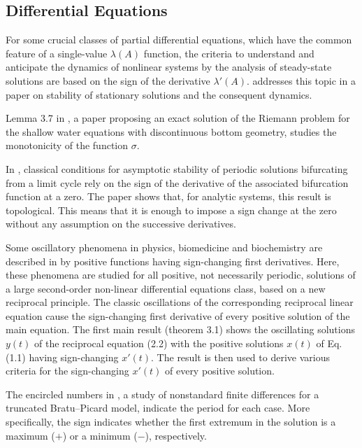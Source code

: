 \documentclass[11pt]{book}
\begin{document}

\subsection{Differential Equations}

For some crucial classes of partial differential equations, which have the common feature of
a single-value $\lambda\left(A\right)$ function, the criteria to
understand and anticipate the dynamics of nonlinear systems by the
analysis of steady-state solutions are based on the sign of the derivative
$\lambda'\left(A\right)$. \cite{politi2007modified} addresses this topic in a paper on stability of
stationary solutions and the consequent dynamics.

Lemma 3.7 in \cite{bernetti2008exact}, a paper proposing an exact solution of the Riemann
problem for the shallow water equations with discontinuous bottom geometry, studies the monotonicity of
the function $\sigma$.

In \cite{makarenkov2011asymptotic}, classical conditions for asymptotic
stability of periodic solutions bifurcating from a limit cycle rely
on the sign of the derivative of the associated bifurcation function
at a zero. The paper shows that, for analytic systems, this result
is topological. This means that it is enough to impose a sign change
at the zero without any assumption on the successive derivatives.

Some oscillatory phenomena in physics, biomedicine and
biochemistry are described in \cite{pavsic2015sign} by positive functions
having sign-changing first derivatives. Here, these phenomena are studied for all
positive, not necessarily periodic, solutions of a large second-order
non-linear differential equations class, based on a new reciprocal
principle. The classic oscillations of the corresponding reciprocal
linear equation cause the sign-changing first derivative of every
positive solution of the main equation. The first main result (theorem
3.1) shows the oscillating solutions $y\left(t\right)$ of
the reciprocal equation (2.2) with the positive solutions $x\left(t\right)$
of Eq. (1.1) having sign-changing $x'\left(t\right)$. The result is then
used to derive various criteria for the sign-changing $x'\left(t\right)$
of every positive solution.

The encircled numbers in \cite{zegeling2018nonstandard}, a study of nonstandard finite differences for a truncated
Bratu–Picard model, indicate
the period for each case. More specifically, the sign indicates whether the first extremum
in the solution is a maximum ($+$) or a minimum ($-$), respectively.
\end{document}
